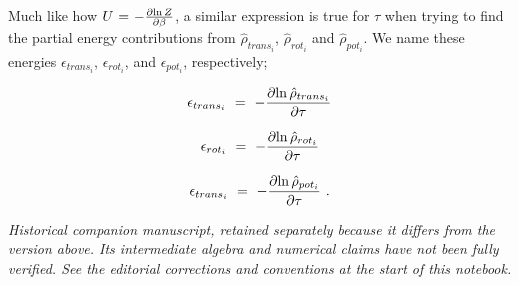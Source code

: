 \documentclass{article}
\newcounter{subsubsubsection}[subsubsection]
\begin{document}
Much like how \begin{math} U \hspace{0.025cm} = \hspace{0.025cm} - \frac{\partial{\ln{Z}}}{\partial{\beta}} \end{math}, a similar expression is true for \begin{math} \tau \end{math} when trying to find the partial energy contributions from \begin{math} \hat{\rho}_{trans_i} \end{math}, \begin{math} \hat{\rho}_{rot_i} \end{math} and \begin{math} \hat{\rho}_{pot_i} \end{math}. We name these energies \begin{math} \epsilon_{trans_i} \end{math}, \begin{math} \epsilon_{rot_i} \end{math}, and \begin{math} \epsilon_{pot_i} \end{math}, respectively;

\begin{equation} \label{eb-eq-1-241}
\epsilon_{trans_i} \hspace{0.125cm} = \hspace{0.125cm} - \frac{\partial{\ln{\hat{\rho}_{trans_i}}}}{\partial{\tau}}
\end{equation}

\begin{equation} \label{eb-eq-1-242}
\epsilon_{rot_i} \hspace{0.125cm} = \hspace{0.125cm} - \frac{\partial{\ln{\hat{\rho}_{rot_i}}}}{\partial{\tau}}
\end{equation}

\begin{equation} \label{eb-eq-1-243}
\epsilon_{trans_i} \hspace{0.125cm} = \hspace{0.125cm} - \frac{\partial{\ln{\hat{\rho}_{pot_i}}}}{\partial{\tau}}\hspace{0.125cm} .
\end{equation}

\textit{Historical companion manuscript, retained separately because it differs from the version above. Its intermediate algebra and numerical claims have not been fully verified. See the editorial corrections and conventions at the start of this notebook.}
\end{document}
